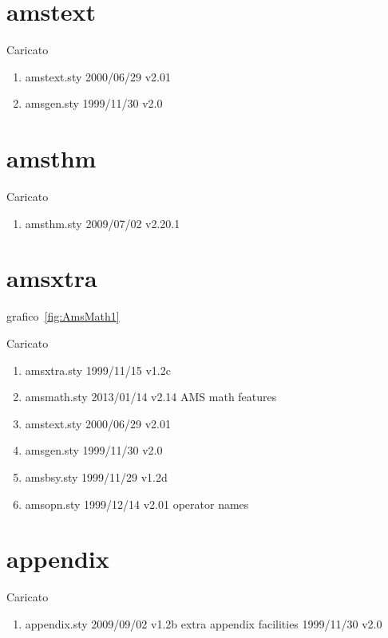 \section{amstext}

Caricato 
\begin{enumerate}
\item amstext.sty 2000/06/29 v2.01
\item amsgen.sty 1999/11/30 v2.0
\end{enumerate}
\section{amsthm}

Caricato 
\begin{enumerate}
\item amsthm.sty 2009/07/02 v2.20.1
\end{enumerate}
\section{amsxtra}

grafico~\vref{fig:AmsMath1}

Caricato 
\begin{enumerate}
\item amsxtra.sty 1999/11/15 v1.2c
\item amsmath.sty 2013/01/14 v2.14 AMS math features
\item amstext.sty 2000/06/29 v2.01
\item amsgen.sty 1999/11/30 v2.0
\item amsbsy.sty 1999/11/29 v1.2d
\item amsopn.sty 1999/12/14 v2.01 operator names
\end{enumerate}
\section{appendix}

Caricato 
\begin{enumerate}
\item appendix.sty 2009/09/02 v1.2b extra appendix facilities 1999/11/30 v2.0
\end{enumerate}
